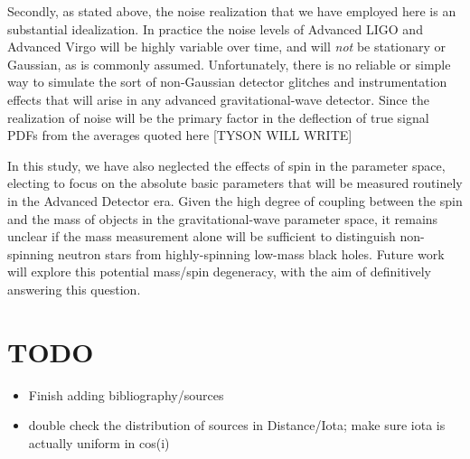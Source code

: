 \documentclass[11pt,a4paper]{emulateapj}
\newcommand{\carl}[1]{{\color{red}  #1}}
\begin{document}
Secondly, as stated above, the noise realization that we have employed here is an substantial idealization.  In practice the noise levels of Advanced LIGO and Advanced Virgo will be highly variable over time, and will \emph{not} be stationary or Gaussian, as is commonly assumed.  Unfortunately, there is no reliable or simple way to simulate the sort of non-Gaussian detector glitches and instrumentation effects that will arise in any advanced gravitational-wave detector.  Since the realization of noise will be the primary factor in the deflection of true signal PDFs from the averages quoted here \carl{[TYSON WILL WRITE]}

In this study, we have also neglected the effects of spin in the parameter space, electing to focus on the absolute basic
 parameters that will be measured routinely in the Advanced Detector era.  Given the high degree of coupling
between the spin and the mass of objects in the gravitational-wave parameter space, it remains unclear
if the mass measurement alone will be sufficient to distinguish non-spinning neutron stars from highly-spinning low-mass
black holes.  Future work will explore this potential mass/spin degeneracy, with the aim of definitively answering this question.  

\carl{
\section{TODO}
 \begin{itemize}
 \item Finish adding bibliography/sources
 \item double check the distribution of sources in Distance/Iota; make sure iota is actually uniform in cos(i)
 \end{itemize}
 }


{}
\end{document}
